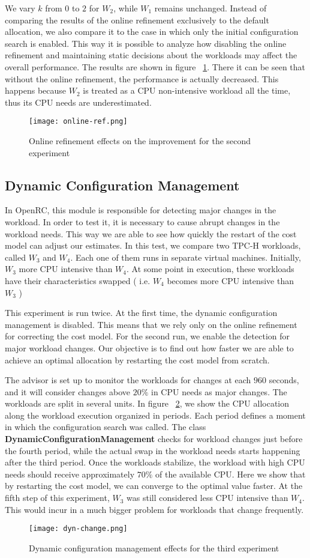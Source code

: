 We vary $k$ from $0$ to $2$ for $W_{2}$, while $W_{1}$ remains unchanged. Instead of comparing the results of the online refinement exclusively to the default allocation, we also compare it to the case in which only the initial configuration search is enabled. This way it is possible to analyze how disabling the online refinement and maintaining static decisions about the workloads may affect the overall performance. The results are shown in figure ~\ref{fig:online-ref-pf}. There it can be seen that without the online refinement, the performance is actually decreased. This happens because $W_{2}$ is treated as a CPU non-intensive workload all the time, thus its CPU needs are underestimated.
\begin{figure}[ht]
 \centering
 \texttt{[image: online-ref.png]}
 \caption{Online refinement effects on the improvement for the second experiment}
 \label{fig:online-ref-pf}
\end{figure} 

\subsection{Dynamic Configuration Management}

In OpenRC, this module is responsible for detecting major changes in the workload. In order to test it, it is necessary to cause abrupt changes in the workload needs. This way we are able to see how quickly the restart of the cost model can adjust our estimates. In this test, we compare two TPC-H workloads, called $W_{3}$ and $W_{4}$. Each one of them runs in separate virtual machines. Initially, $W_{3}$ more CPU intensive than $W_{4}$. At some point in execution, these workloads have their characteristics swapped ( i.e. $W_{4}$ becomes more CPU intensive than $W_{3}$ )

This experiment is run twice. At the first time, the dynamic configuration management is disabled. This means that we rely only on the online refinement for correcting the cost model. For the second run, we enable the detection for major workload changes. Our objective is to find out how faster we are able to achieve an optimal allocation by restarting the cost model from scratch.

The advisor is set up to monitor the workloads for changes at each $960$ seconds, and it will consider changes above $20\%$ in CPU needs as major changes. The workloads are split in several units. In figure ~\ref{fig:wkchanges}, we show the CPU allocation along the workload execution organized in periods. Each period defines a moment in which the configuration search was called. The class \textbf{DynamicConfigurationManagement} checks for workload changes just before the fourth period, while the actual swap in the workload needs starts happening after the third period. Once the workloads stabilize, the workload with high CPU needs should receive approximately $70\%$  of the available CPU. Here we show that by restarting the cost model, we can converge to the optimal value faster. At the fifth step of this experiment, $W_{3}$  was still considered less CPU intensive than $W_{4}$. This would incur in a much bigger problem for workloads that change frequently.

\begin{figure}[ht]
 \centering
 \texttt{[image: dyn-change.png]}
 \caption{Dynamic configuration management effects for the third experiment}
 \label{fig:wkchanges}
\end{figure} 


